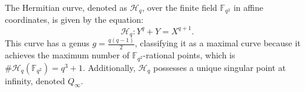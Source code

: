 \documentclass[a4paper]{amsart}
\theoremstyle{plain}
\theoremstyle{definition}
\theoremstyle{remark}
\begin{document}
%	
%	
%	
%	
%	
%	
%	
%	


The Hermitian curve, denoted as $\mathscr{H}_q$, over the finite field $\mathbb{F}_{q^2}$ in affine coordinates, is given by the equation:
\[
	\mathscr{H}_q: Y^q + Y = X^{q+1}.
\]
This curve has a genus $g = \frac{q(q-1)}{2}$, classifying it as a maximal curve because it achieves the maximum number of $\mathbb{F}_{q^2}$-rational points, which is $\#\mathscr{H}_q(\mathbb{F}_{q^2}) = q^3 + 1$. Additionally, $\mathscr{H}_q$ possesses a unique singular point at infinity, denoted $Q_{\infty}$.
\end{document}
